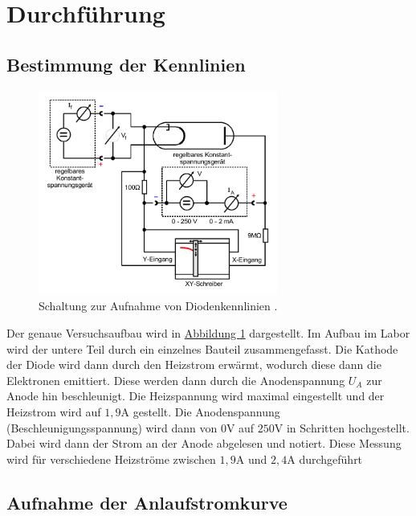 \section{Durchführung}
\label{sec:Durchführung}


\subsection{Bestimmung der Kennlinien}
\label{sec:Kennlinien}

\begin{figure}
    \centering
    \includegraphics[width=0.7\textwidth]{pictures/Aufbau.pdf}
    \caption{Schaltung zur Aufnahme von Diodenkennlinien \cite{v504}.}
    \label{fig:Aufbau}
\end{figure}

Der genaue Versuchsaufbau wird in \hyperref[fig:Aufbau]{Abbildung \ref{fig:Aufbau}} dargestellt.
Im Aufbau im Labor wird der untere Teil durch ein einzelnes Bauteil zusammengefasst.
Die Kathode der Diode wird dann durch den Heizstrom erwärmt, wodurch diese dann die Elektronen emittiert.
Diese werden dann durch die Anodenspannung $U_A$ zur Anode hin beschleunigt.
Die Heizspannung wird maximal eingestellt und der Heizstrom wird auf $1,9 \unit\ampere$ gestellt.
Die Anodenspannung (Beschleunigungsspannung) wird dann von $0 \unit\volt$ auf $250 \unit\volt$ in Schritten hochgestellt.
Dabei wird dann der Strom an der Anode abgelesen und notiert.
Diese Messung wird für verschiedene Heizströme zwischen $1,9 \unit\ampere$ und $2,4 \unit\ampere$ durchgeführt

\subsection{Aufnahme der Anlaufstromkurve}

